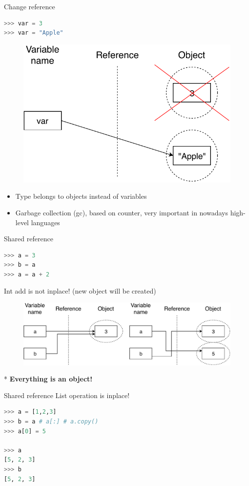 \documentclass{../TexTemplate/myslide}
\begin{document}
\begin{frame}[fragile]{Change reference}
\begin{lstlisting}[language=python]
>>> var = 3
>>> var = "Apple"
\end{lstlisting}
\begin{figure}
\centering
\includegraphics[width=0.5\linewidth]{fig/python-newref.pdf}
\end{figure}
\begin{itemize}
	\item Type belongs to objects instead of variables
	\item Garbage collection (gc), based on counter, very important in nowadays high-level languages
\end{itemize}
\end{frame}

\begin{frame}[fragile]{Shared reference}
\begin{lstlisting}[language=python]
>>> a = 3
>>> b = a
>>> a = a + 2
\end{lstlisting}
Int add is not inplace! (new object will be created)
\begin{figure}
\centering
\includegraphics[width=0.8\linewidth]{fig/python-share.pdf}
\end{figure}
* \textbf{Everything is an object!}
\end{frame}

\begin{frame}[fragile]{Shared reference}
List operation is inplace!
\begin{lstlisting}[language=python]
>>> a = [1,2,3]
>>> b = a # a[:] # a.copy()
>>> a[0] = 5

>>> a
[5, 2, 3]
>>> b
[5, 2, 3]
\end{lstlisting}
\end{frame}
\end{document}
